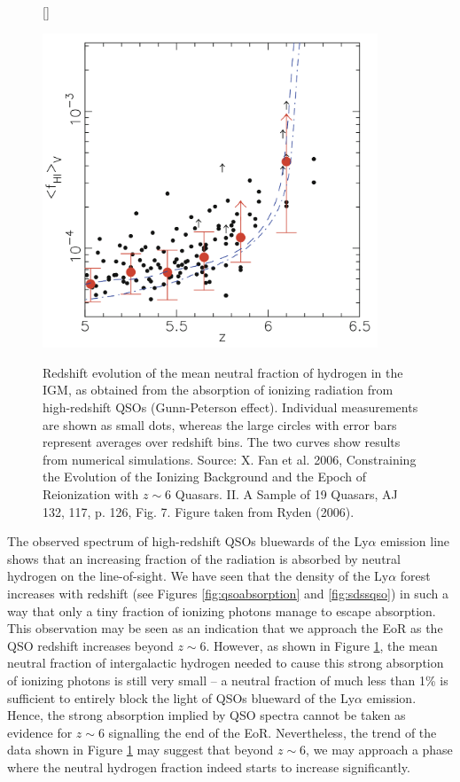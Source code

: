 \documentclass[a4paper,11pt]{article}
\begin{document}
\begin{figure}[t]
    [\FBwidth]
    {\caption{\footnotesize{Redshift evolution of the mean neutral fraction of hydrogen in the IGM, as obtained from the absorption of ionizing radiation from high-redshift QSOs (Gunn-Peterson effect). Individual measurements are shown as small dots, whereas the large circles with error bars represent averages over redshift bins. The two curves show results from numerical simulations. Source: X. Fan et al. 2006, Constraining the Evolution of the Ionizing Background and the Epoch of Reionization with $z\sim6$ Quasars. II. A Sample of 19 Quasars, AJ 132, 117, p. 126, Fig. 7. Figure taken from Ryden (2006).}}
    \label{fig:hivsz}}
    {\includegraphics[width=10cm]{figures/HIvsz.png}}
\end{figure}

{\noindent}The observed spectrum of high-redshift QSOs bluewards of the Ly$\alpha$ emission line shows that an increasing fraction of the radiation is absorbed by neutral hydrogen on the line-of-sight. We have seen that the density of the Ly$\alpha$ forest increases with redshift (see Figures \ref{fig:qsoabsorption} and \ref{fig:sdssqso}) in such a way that only a tiny fraction of ionizing photons manage to escape absorption. This observation may be seen as an indication that we approach the EoR as the QSO redshift increases beyond $z\sim6$. However, as shown in Figure \ref{fig:hivsz}, the mean neutral fraction of intergalactic hydrogen needed to cause this strong absorption of ionizing photons is still very small -- a neutral fraction of much less than 1\% is sufficient to entirely block the light of QSOs blueward of the Ly$\alpha$ emission. Hence, the strong absorption implied by QSO spectra cannot be taken as evidence for $z\sim6$ signalling the end of the EoR. Nevertheless, the trend of the data shown in Figure \ref{fig:hivsz} may suggest that beyond $z\sim6$, we may approach a phase where the neutral hydrogen fraction indeed starts to increase significantly.
\end{document}
